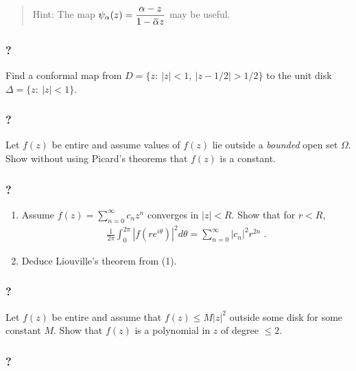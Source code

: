\begin{quote}
Hint: The map
\(\displaystyle{\psi_{\alpha}(z)=\frac{\alpha-z}{1-\mkern 1.5mu\overline{\mkern-1.5mu\alpha\mkern-1.5mu}\mkern 1.5muz}}\)
may be useful.
\end{quote}

\hypertarget{section-93}{%
\subsubsection{?}\label{section-93}}

Find a conformal map from \(D = \{z :\  |z| < 1,\ |z - 1/2| > 1/2\}\) to
the unit disk \(\Delta=\{z: \ |z|<1\}\).

\hypertarget{section-94}{%
\subsubsection{?}\label{section-94}}

Let \(f(z)\) be entire and assume values of \(f(z)\) lie outside a
\emph{bounded} open set \(\Omega\). Show without using Picard's theorems
that \(f(z)\) is a constant.

\hypertarget{section-95}{%
\subsubsection{?}\label{section-95}}

\begin{enumerate}
\def\labelenumi{(\arabic{enumi})}
\item
  Assume \(\displaystyle f(z) = \sum_{n=0}^\infty c_n z^n\) converges in
  \(|z| < R\). Show that for \(r <R\),
  \begin{align*}\frac{1}{2 \pi} \int_0^{2 \pi} |f(r e^{i \theta})|^2 d \theta
  = \sum_{n=0}^\infty |c_n|^2 r^{2n} \; .\end{align*}
\item
  Deduce Liouville's theorem from (1).
\end{enumerate}

\hypertarget{section-96}{%
\subsubsection{?}\label{section-96}}

Let \(f(z)\) be entire and assume that \(f(z) \leq M |z|^2\) outside
some disk for some constant \(M\). Show that \(f(z)\) is a polynomial in
\(z\) of degree \(\leq 2\).

\hypertarget{section-97}{%
\subsubsection{?}\label{section-97}}

